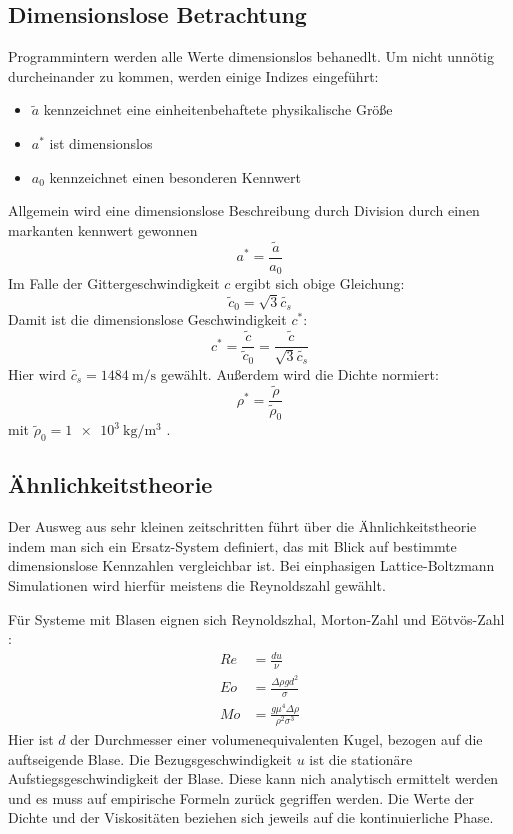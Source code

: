 \documentclass[a4paper,10pt]{scrreprt}
\begin{document}
\subsection{Dimensionslose Betrachtung}
Programmintern werden alle Werte dimensionslos behanedlt.
Um nicht unnötig durcheinander zu kommen, werden einige Indizes eingeführt:
\begin{itemize}
 \item $\tilde{a}$ kennzeichnet eine einheitenbehaftete physikalische Größe
\item $a^*$ ist dimensionslos
 \item $a_0$ kennzeichnet einen besonderen Kennwert
\end{itemize}
Allgemein wird eine dimensionslose Beschreibung durch Division durch einen markanten kennwert gewonnen
\begin{equation}
 a^* = \frac{\tilde{a}}{a_0}
\end{equation}
Im Falle der Gittergeschwindigkeit $c$ ergibt sich obige Gleichung:
\begin{equation}
 \tilde{c}_0 = \sqrt{3} \tilde{c_s}
\end{equation}
Damit ist die dimensionslose Geschwindigkeit $c^*$:
\begin{equation}
 c^* = \frac{\tilde{c}}{\tilde{c}_0} = \frac{\tilde{c}}{\sqrt{3} \tilde{c_s}} 
\end{equation}
Hier wird $\tilde{c_s} = \SI{1484}{\metre \per \second}$ gewählt.
Außerdem wird die Dichte normiert:
\begin{equation}
 \rho^* = \frac{\tilde{\rho}}{\tilde{\rho}_0}
\end{equation}
mit $\tilde{\rho}_0 = \SI{1e3}{\kilo \gram \per \cubic \metre}$ .

\subsection{Ähnlichkeitstheorie}
Der Ausweg aus sehr kleinen zeitschritten führt über die Ähnlichkeitstheorie indem man sich ein Ersatz-System definiert, das mit Blick auf bestimmte dimensionslose Kennzahlen vergleichbar ist.
Bei einphasigen Lattice-Boltzmann Simulationen wird hierfür meistens die Reynoldszahl gewählt.

Für Systeme mit Blasen eignen sich Reynoldszhal, Morton-Zahl und Eötvös-Zahl \cite{Clift2005}:
\begin{align}
 \mathit{Re} &= \frac{d u}{\nu} \\
 \mathit{Eo} &= \frac{\Delta \rho g d^2}{\sigma} \\
 \mathit{Mo} &= \frac{g \mu^4 \Delta \rho}{\rho^2 \sigma^3}
\end{align}
Hier ist $d$ der Durchmesser einer volumenequivalenten Kugel, bezogen auf die auftseigende Blase. 
Die Bezugsgeschwindigkeit $u$ ist die stationäre Aufstiegsgeschwindigkeit der Blase. 
Diese kann nich analytisch ermittelt werden und es muss auf empirische Formeln zurück gegriffen werden.
Die Werte der Dichte und der Viskositäten beziehen sich jeweils auf die kontinuierliche Phase.
\end{document}
